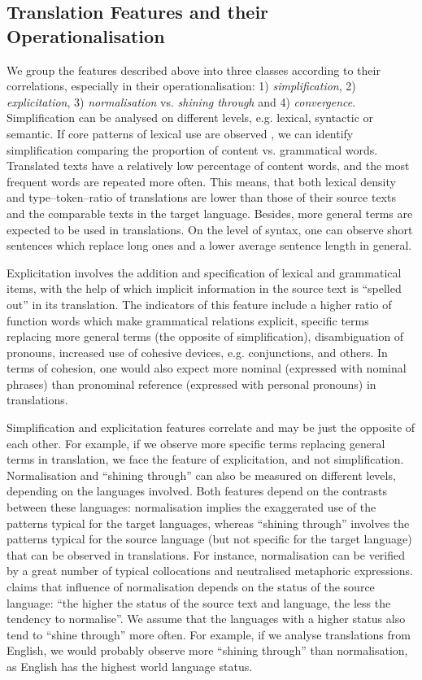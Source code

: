 \documentclass[output=paper]{LSP/langsci}
\begin{document}
\subsection{Translation Features and their Operationalisation} \label{sec:4:2:2}

We group the features described above into three classes according to their correlations, especially in their operationalisation: 1) \textit{simplification}, 2) \textit{explicitation}, 3) \textit{normalisation} vs. \textit{shining through} and 4) \textit{convergence}. Simplification can be analysed on different levels, e.g. lexical, syntactic or semantic. If core patterns of lexical use are observed \citep[see][]{Laviosa1998}, we can identify simplification comparing the proportion of content vs. grammatical words. Translated texts have a relatively low percentage of content words, and the most frequent words are repeated more often. This means, that both lexical density and type--token--ratio of translations are lower than those of their source texts and the comparable texts in the target language.  Besides, more general terms are expected to be used in translations. On the level of syntax, one can observe short sentences which replace long ones and a lower average sentence length in general.

Explicitation involves the addition and specification of lexical and grammatical items, with the help of which implicit information in the source text is “spelled out” in its translation.  The indicators of this feature include a higher ratio of function words which make grammatical relations explicit, specific terms replacing more general terms (the opposite of simplification), disambiguation of pronouns, increased use of cohesive devices, e.g. conjunctions, and others. In terms of cohesion, one would also expect more nominal (expressed with nominal phrases) than pronominal reference (expressed with personal pronouns) in translations.

Simplification and explicitation features correlate and may be just the opposite of each other.  For example, if we observe more specific terms replacing general terms in translation, we face the feature of explicitation, and not simplification. Normalisation and “shining through” can also be measured on different levels, depending on the languages involved. Both features depend on the contrasts between these languages: normalisation implies the exaggerated use of the patterns typical for the target languages, whereas “shining through” involves the patterns typical for the source language (but not specific for the target language) that can be observed in translations. For instance, normalisation can be verified by a great number of typical collocations and neutralised metaphoric expressions. \citet{Baker1996} claims that influence of normalisation depends on the status of the source language: “the higher the status of the source text and language, the less the tendency to normalise”. We assume that the languages with a higher status also tend to “shine through” more often. For example, if we analyse translations from English, we would probably observe more “shining through” than normalisation, as English has the highest world language status.
\end{document}
